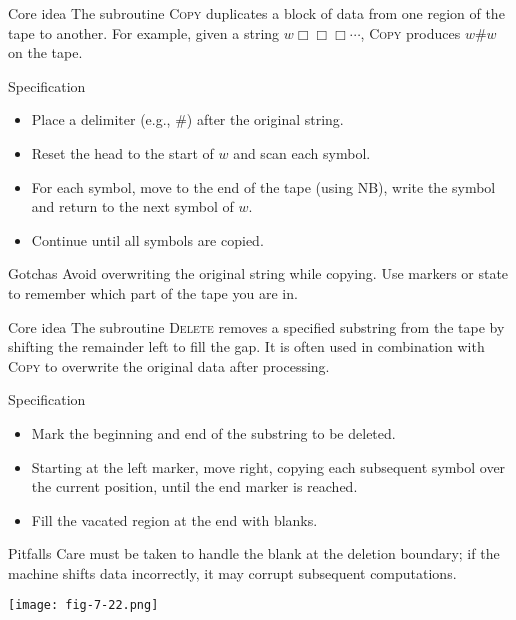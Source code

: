 \begin{frame}[t]{}
  \begin{tblock}{Core idea}
    The subroutine \textsc{Copy} duplicates a block of data from one
    region of the tape to another.  For example, given a string
    $w\Box\Box\Box\cdots$, \textsc{Copy} produces $w\#w$ on the tape.
  \end{tblock}
  \begin{tblock}{Specification}
    \begin{itemize}
      \item Place a delimiter (e.g., $\#$) after the original string.
      \item Reset the head to the start of $w$ and scan each symbol.
      \item For each symbol, move to the end of the tape (using
        \textsc{NB}), write the symbol and return to the next symbol of
        $w$.
      \item Continue until all symbols are copied.
    \end{itemize}
  \end{tblock}
  \begin{talert}{Gotchas}
    Avoid overwriting the original string while copying.  Use markers
    or state to remember which part of the tape you are in.
  \end{talert}
  \label{fr:7.4-06}
\end{frame}

\begin{frame}[t]{}
  \begin{tblock}{Core idea}
    The subroutine \textsc{Delete} removes a specified substring from
    the tape by shifting the remainder left to fill the gap.  It is
    often used in combination with \textsc{Copy} to overwrite the
    original data after processing.
  \end{tblock}
  \begin{tblock}{Specification}
    \begin{itemize}
      \item Mark the beginning and end of the substring to be deleted.
      \item Starting at the left marker, move right, copying each
        subsequent symbol over the current position, until the end
        marker is reached.
      \item Fill the vacated region at the end with blanks.
    \end{itemize}
  \end{tblock}
  \begin{talert}{Pitfalls}
    Care must be taken to handle the blank at the deletion boundary; if
    the machine shifts data incorrectly, it may corrupt subsequent
    computations.
  \end{talert}
  \centering
  \texttt{[image: fig-7-22.png]} %
  \label{fr:7.4-07}
\end{frame}

